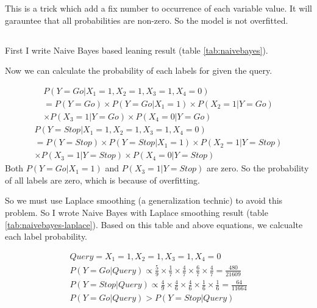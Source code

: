 \documentclass[en]{university}
\begin{document}
\setupdocument

\section{}
\subsection{}
This is a trick which add a fix number to occurrence of each variable value. It 
will garauntee that all probabilities are non-zero. So the model is not overfitted.

\subsection{}
First I write Naive Bayes based leaning result
(table \ref{tab:naivebayes}).

Now we can calculate the probability of each labels for given the query.

\begin{multline*}
    P(Y=Go | X_1 = 1, X_2 = 1, X_3 = 1, X_4 = 0) \\
    = P(Y=Go) \times P(Y=Go | X_1 = 1) \times P(X_2 = 1 | Y=Go) \\ \times P(X_3 = 1 | Y=Go) \times P(X_4 = 0 | Y=Go) 
\end{multline*}
\begin{multline*}
    P(Y=Stop | X_1 = 1, X_2 = 1, X_3 = 1, X_4 = 0) \\
    = P(Y=Stop) \times P(Y=Stop | X_1 = 1) \times P(X_2 = 1 | Y=Stop) \\ \times P(X_3 = 1 | Y=Stop)  \times P(X_4 = 0 | Y=Stop)
\end{multline*}
Both $P(Y=Go | X_1 = 1)$ and $P(X_3 = 1 | Y=Stop)$ are zero. So the probability of all labels are zero, which is 
because of overfitting.

So we must use Laplace smoothing (a generalization technic) to avoid this problem. So I wrote Naive Bayes with Laplace
smoothing result (table \ref{tab:naivebayes-laplace}). Based on this table and above equations, we calcualte each label 
probability. 

\begin{gather*}
    Query = X_1 = 1, X_2 = 1, X_3 = 1, X_4 = 0 \\
    P(Y=Go | Query) \propto \frac{5}{9} \times \frac{1}{7} \times  \frac{4}{7} \times \frac{6}{7} \times \frac{4}{7} = \frac{480}{21609} \\
    P(Y=Stop | Query) \propto \frac{4}{9} \times \frac{4}{6} \times  \frac{4}{6} \times \frac{1}{6} \times \frac{1}{6} = \frac{64}{11664} \\
    P(Y=Go | Query) > P(Y=Stop | Query)
\end{gather*}
\end{document}
